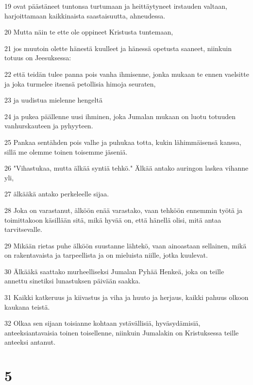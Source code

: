 \par 19 ovat päästäneet tuntonsa turtumaan ja heittäytyneet irstauden valtaan, harjoittamaan kaikkinaista saastaisuutta, ahneudessa.
\par 20 Mutta näin te ette ole oppineet Kristusta tuntemaan,
\par 21 jos muutoin olette hänestä kuulleet ja hänessä opetusta saaneet, niinkuin totuus on Jeesuksessa:
\par 22 että teidän tulee panna pois vanha ihmisenne, jonka mukaan te ennen vaelsitte ja joka turmelee itsensä petollisia himoja seuraten,
\par 23 ja uudistua mielenne hengeltä
\par 24 ja pukea päällenne uusi ihminen, joka Jumalan mukaan on luotu totuuden vanhurskauteen ja pyhyyteen.
\par 25 Pankaa sentähden pois valhe ja puhukaa totta, kukin lähimmäisensä kanssa, sillä me olemme toinen toisemme jäseniä.
\par 26 "Vihastukaa, mutta älkää syntiä tehkö." Älkää antako auringon laskea vihanne yli,
\par 27 älkääkä antako perkeleelle sijaa.
\par 28 Joka on varastanut, älköön enää varastako, vaan tehköön ennemmin työtä ja toimittakoon käsillään sitä, mikä hyvää on, että hänellä olisi, mitä antaa tarvitsevalle.
\par 29 Mikään rietas puhe älköön suustanne lähtekö, vaan ainoastaan sellainen, mikä on rakentavaista ja tarpeellista ja on mieluista niille, jotka kuulevat.
\par 30 Älkääkä saattako murheelliseksi Jumalan Pyhää Henkeä, joka on teille annettu sinetiksi lunastuksen päivään saakka.
\par 31 Kaikki katkeruus ja kiivastus ja viha ja huuto ja herjaus, kaikki pahuus olkoon kaukana teistä.
\par 32 Olkaa sen sijaan toisianne kohtaan ystävällisiä, hyväsydämisiä, anteeksiantavaisia toinen toisellenne, niinkuin Jumalakin on Kristuksessa teille anteeksi antanut.

\chapter{5}

